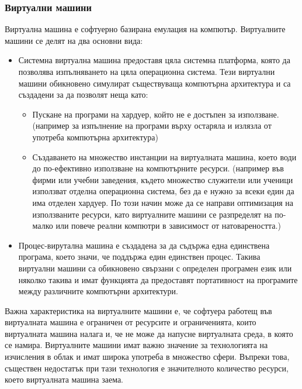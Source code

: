 \documentclass[pdftex,14pt,a4paper]{extreport}
\begin{document}
\subsubsection {Виртуални машини}
Виртуална машина е софтуерно базирана емулация на компютър. Виртуалните машини се делят на два основни вида:
\begin{itemize}
  \item Системна виртуална машина предоставя цяла системна платформа, която да позволява изпълняването на цяла операционна система. Тези виртуални машини обикновено симулират съществуваща компютърна архитектура и са създадени за да позволят неща като:
  \begin{itemize}
    \item Пускане на програми на хардуер, който не е достъпен за използване. (например за изпълнение на програми върху остаряла и излязла от употреба компютърна архитектура)
    \item Създаването на множество инстанции на виртуалната машина, което води до по-ефективно използване на компютърните ресурси. (например във фирми или учебни заведения, където множество служители или ученици използват отделна операционна система, без да е нужно за всеки един да има отделен хардуер. По този начин може да се направи оптимизация на използваните ресурси, като виртуалните машини се разпределят на по-малко или повече реални компютри в зависимост от натовареността.)
  \end{itemize}
\item Процес-вирутална машина е създадена за да съдържа една единствена програма, което значи, че поддържа един единствен процес. Такива виртуални машини са обикновено свързани с определен програмен език или няколко такива и имат функцията да предоставят портативност на програмите между различните компютърни архитектури.
\end{itemize}
Важна характеристика на виртуалните машини е, че софтуера работещ във виртуалната машина е ограничен от ресурсите и ограниченията, които виртуалната машина налага и, че не може да напусне виртуалната среда, в която се намира. Виртуалните машини имат важно значение за технологията на изчисления в облак и имат широка употреба в множество сфери. Въпреки това, съществен недостатък при тази технология е значителното количество ресурси, което виртуалната машина заема.
\end{document}
